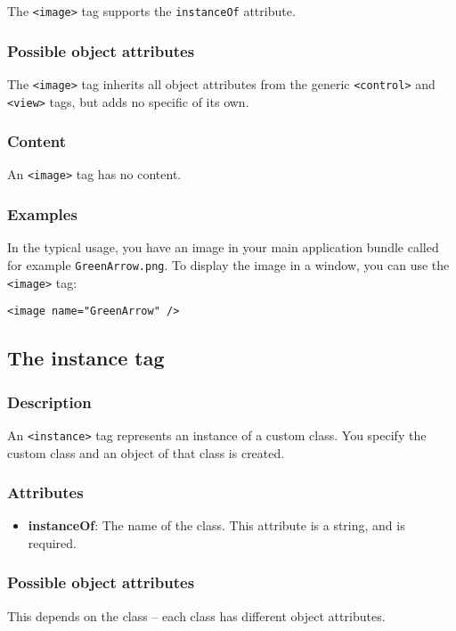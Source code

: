 The \texttt{<image>} tag supports the \texttt{instanceOf} attribute.

\subsubsection{Possible object attributes}
The \texttt{<image>} tag inherits all object attributes from the
generic \texttt{<control>} and \texttt{<view>} tags, but adds no
specific of its own.

\subsubsection{Content}
An \texttt{<image>} tag has no content.

\subsubsection{Examples}
In the typical usage, you have an image in your main application
bundle called for example \texttt{GreenArrow.png}.  To display the
image in a window, you can use the \texttt{<image>} tag:
\begin{verbatim}
<image name="GreenArrow" />
\end{verbatim}

\subsection{The instance tag}

\subsubsection{Description}
An \texttt{<instance>} tag represents an instance of a custom class.  You
specify the custom class and an object of that class is created.

\subsubsection{Attributes}
\begin{itemize}
\item {\bf instanceOf}: The name of the class.  This attribute is a
  string, and is required.
\end{itemize}

\subsubsection{Possible object attributes}
This depends on the class -- each class has different object attributes.

